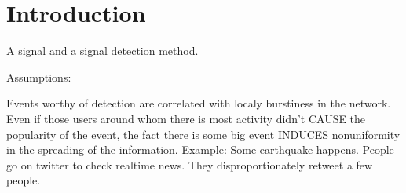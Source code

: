 \chapter{Introduction}

A signal and a signal detection method.

Assumptions:

Events worthy of detection are correlated with localy burstiness in the network. Even if those users around whom there is most activity didn't CAUSE the popularity of the event, the fact there is some big event INDUCES nonuniformity in the spreading of the information. Example: Some earthquake happens. People go on twitter to check realtime news. They disproportionately retweet a few people.
